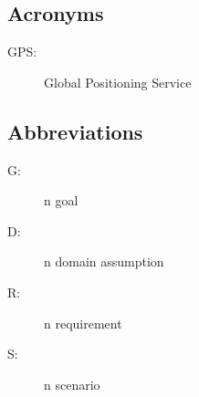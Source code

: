 \documentclass[../../rasd.tex]{subfiles}
\begin{document}
		\subsection{Acronyms}
		\begin{description}
		\item[GPS:]Global Positioning Service
		\end{description}
		\subsection{Abbreviations}
		\begin{description}
			\item[G:]n goal
			\item[D:]n domain assumption
			\item[R:]n requirement
			\item[S:]n scenario
			
		\end{description}
		
\end{document}
